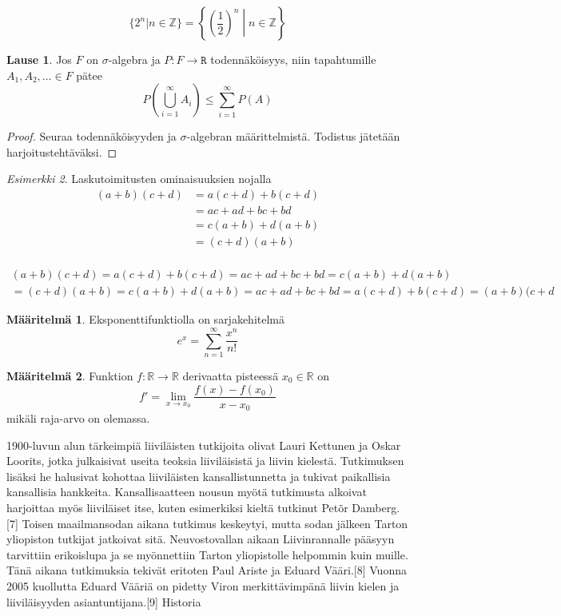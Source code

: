 \documentclass[a4paper]{article}
\theoremstyle{definition}
\newtheorem{lause}{Lause}[section]
\newtheorem{maar}{Määritelmä}
\theoremstyle{remark}
\newtheorem{esim}[lause]{Esimerkki}
\begin{document}
\[
\{ 2^n|n \in \mathbb{Z} \} = \left\lbrace \left( \frac{1}{2} \right) ^n \middle| n  \in \mathbb{Z} \right\rbrace
\]
\begin{lause}
Jos $F$ on $\sigma$-algebra ja $P:F \rightarrow \mathtt{R}$ todennäköisyys, niin tapahtumille $A_1, A_2, \dots \in F$ pätee
\[
P \left( \bigcup_{i=1}^\infty A_i \right) \leq \sum _{i=1}^\infty P \left( A \right)
\]
\end{lause}
\begin{proof}
Seuraa todennäköisyyden ja $\sigma$-algebran määrittelmistä. Todistus jätetään harjoitustehtäväksi.
\end{proof}
\begin{esim}
Laskutoimitusten ominaisuuksien nojalla
\begin{align*}
(a+b)(c+d) &= a(c+d)+b(c+d)\\
		&=ac+ad+bc+bd\\
		&=c(a+b)+d(a+b)\\
		&=(c+d)(a+b)\\	
\end{align*}

\begin{multline*}
(a+b)(c+d)=a(c+d)+b(c+d)
=ac+ad+bc+bd
=c(a+b)+d(a+b)\\
=(c+d)(a+b)=c(a+b)+d(a+b)=ac+ad+bc+bd=a(c+d)+b(c+d)=(a+b)(c+d
\end{multline*}
\end{esim}

\begin{maar}
Eksponenttifunktiolla on sarjakehitelmä
\begin{equation}\label{expsarja}
e^x= \sum_{n=1}^\infty \frac{x^n}{n!}
\end{equation}
\end{maar}

\begin{maar}
Funktion $f:\mathbb{R}\rightarrow\mathbb{R}$ derivaatta pisteessä $x_0\in\mathbb{R}$ on
\[
f'=\lim_{x \rightarrow x_0}\frac{f(x)-f(x_0)}{x-x_0}
\]
mikäli raja-arvo on olemassa.
\end{maar}


1900-luvun alun tärkeimpiä liiviläisten tutkijoita olivat Lauri Kettunen ja Oskar Loorits, jotka julkaisivat useita teoksia liiviläisistä ja liivin kielestä. Tutkimuksen lisäksi he halusivat kohottaa liiviläisten kansallistunnetta ja tukivat paikallisia kansallisia hankkeita. Kansallisaatteen nousun myötä tutkimusta alkoivat harjoittaa myös liiviläiset itse, kuten esimerkiksi kieltä tutkinut Petõr Damberg.[7] Toisen maailmansodan aikana tutkimus keskeytyi, mutta sodan jälkeen Tarton yliopiston tutkijat jatkoivat sitä. Neuvostovallan aikaan Liivinrannalle pääsyyn tarvittiin erikoislupa ja se myönnettiin Tarton yliopistolle helpommin kuin muille. Tänä aikana tutkimuksia tekivät eritoten Paul Ariste ja Eduard Vääri.[8] Vuonna 2005 kuollutta Eduard Vääriä on pidetty Viron merkittävimpänä liivin kielen ja liiviläisyyden asiantuntijana.[9]
Historia
\end{document}
